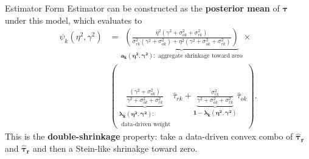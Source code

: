 \documentclass[usenames,dvipsnames]{beamer}
\newcommand{\bstau}{\boldsymbol{\tau}}
\newcommand{\taur}{\boldsymbol{\hat \tau_r}}
\newcommand{\tauu}{\boldsymbol{\hat \tau_r}}
\theoremstyle{definition} %
\begin{document}
\begin{frame}{Estimator Form}
Estimator can be constructed as the \textbf{posterior mean} of $\bstau$ under this model, which evaluates to 
\begin{equation}\label{eq:shrinkForm}
\begin{aligned}
 \psi_k(\eta^2, \gamma^2) &=  \underbrace{\left( \frac{\eta^2 \left( \gamma^2 + \sigma_{ok}^2 + \sigma_{rk}^2 \right) }{\sigma_{rk}^2 \left( \gamma^2 + \sigma_{ok}^2 \right) + \eta^2 \left( \gamma^2 + \sigma_{ok}^2 + \sigma_{rk}^2 \right) } \right)}_{\boldsymbol{a_k(\eta^2, \gamma^2)}: \text{ aggregate shrinkage toward zero}} \times \\ &\left( \underbrace{ \frac{  \left(\gamma ^2+\sigma_{ok}^2\right)}{\gamma^2 + \sigma_{ok}^2 + \sigma_{rk}^2}}_{\substack{\boldsymbol{\lambda_k(\eta^2, \gamma^2)}:\\ \text{ data-driven weight}}} \hat \tau_{rk}+ \underbrace{\frac{\sigma_{rk}^2}{\gamma^2 + \sigma_{ok}^2 + \sigma_{rk}^2}}_{\boldsymbol{1 - \lambda_k(\eta^2, \gamma^2)}} \hat \tau_{ok} \right).
\end{aligned}
\end{equation} \pause
This is the \textbf{double-shrinkage} property: take a data-driven convex combo of $\tauu$ and $\taur$ and then a Stein-like shrinakge toward zero. 


\end{frame}
\end{document}
